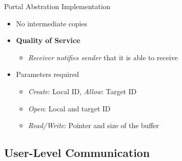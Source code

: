 		\begin{frame}[fragile]{Portal Abstration Implementation}
			\begin{itemize}
				\item No intermediate copies
				\item \textbf{Quality of Service}
				\begin{itemize}
					\item \textit{Receiver notifies sender} that it is able to receive
				\end{itemize}
				\item Parameters required
				\begin{itemize}
					\item \textit{Create}: Local ID, \textit{Allow}: Target ID
					\item \textit{Open}: Local and target ID
					\item \textit{Read/Write}: Pointer and size of the buffer
				\end{itemize}
			\end{itemize}


		\end{frame}

	\subsection{User-Level Communication}

